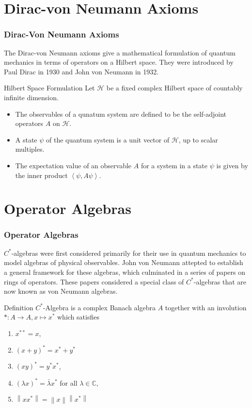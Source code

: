 \documentclass{beamer}
\begin{document}
\section{Dirac-von Neumann Axioms}
\begin{frame}
    \frametitle{Dirac-Von Neumann Axioms}

The Dirac-von Neumann axioms give a mathematical formulation of quantum mechanics in terms of operators on a Hilbert space. They were introduced by Paul Dirac in 1930 and John von Neumann in 1932.

\begin{block}{Hilbert Space Formulation}
    Let \(\mathcal{H}\) be a fixed complex Hilbert space of countably infinite dimension.
    \begin{itemize}
        \item The observables of a qunatum system are defined to be the self-adjoint operators \(A\) on \(\mathcal{H}\).
        \item A state \(\psi\) of the quantum system is a unit vector of \(\mathcal{H}\), up to scalar multiples.
        \item The expectation value of an observable \(A\) for a system in a state \(\psi\) is given by the inner product \(\left \langle \psi,A\psi \right \rangle\).
    \end{itemize}
\end{block}
\end{frame}

\section{Operator Algebras}

\begin{frame}
    \frametitle{Operator Algebras}
    \(C^\ast\)-algebras were first considered primarily for their use in quantum mechanics to model algebras of physical observables. John von Neumann attepted to establish a general framework for these algebras, which culminated in a series of papers on rings of operators. These papers considered a special class of \(C^\ast\)-algebras that are now known as von Neumann algebras.
        \begin{block}{Definition}
            \(C^\ast\)-Algebra is a complex Banach algebra \(A\) together with an involution \(\ast:A \to A, x \mapsto x^\ast\) which satisfies
            \begin{enumerate}
                \item \(x^{\ast\ast}=x\),
                \item \((x+y)^\ast=x^\ast+y^\ast\)
                \item \((xy)^\ast = y^\ast x^\ast\),
                \item \((\lambda x)^\ast=\bar{\lambda}x^\ast\) for all \(\lambda \in \mathbb{C}\),
                \item \(\left \lVert xx^\ast \right \rVert = \left \lVert x \right \rVert \left \lVert x^\ast \right \rVert \)
            \end{enumerate}
        \end{block}\end{frame}
\end{document}
